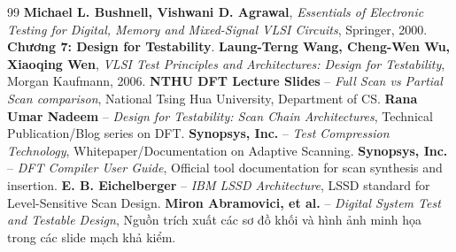 \documentclass[12pt,a4paper]{article}
\begin{document}
\newpage
\tableofcontents

\newpage


\newpage

\newpage

\newpage

\newpage

\newpage

\newpage


\newpage
{}
\begin{thebibliography}{99}
     \textbf{Michael L. Bushnell, Vishwani D. Agrawal}, \textit{Essentials of Electronic Testing for Digital, Memory and Mixed-Signal VLSI Circuits}, Springer, 2000. \textbf{Chương 7: Design for Testability}.
     \textbf{Laung-Terng Wang, Cheng-Wen Wu, Xiaoqing Wen}, \textit{VLSI Test Principles and Architectures: Design for Testability}, Morgan Kaufmann, 2006.
     \textbf{NTHU DFT Lecture Slides} -- \textit{Full Scan vs Partial Scan comparison}, National Tsing Hua University, Department of CS.
     \textbf{Rana Umar Nadeem} -- \textit{Design for Testability: Scan Chain Architectures}, Technical Publication/Blog series on DFT.
     \textbf{Synopsys, Inc.} -- \textit{Test Compression Technology}, Whitepaper/Documentation on Adaptive Scanning.
     \textbf{Synopsys, Inc.} -- \textit{DFT Compiler User Guide}, Official tool documentation for scan synthesis and insertion.
     \textbf{E. B. Eichelberger} -- \textit{IBM LSSD Architecture}, LSSD standard for Level-Sensitive Scan Design.
     \textbf{Miron Abramovici, et al.} -- \textit{Digital System Test and Testable Design}, Nguồn trích xuất các sơ đồ khối và hình ảnh minh họa trong các slide mạch khả kiểm.
\end{thebibliography}
\end{document}
